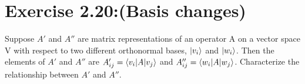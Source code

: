 \section{\Large Exercise 2.20:(Basis changes)}
Suppose $A'$ and $A''$ are matrix representations of an operator A on a vector space V
with respect to two different orthonormal bases, $\ket{v_i}$ and $\ket{w_i}$.
Then the elements of $A'$ and $A''$ are $A_{ij}' = \braket{v_i|A|v_j}$ and
$A_{ij}'' = \braket{w_i|A|w_j}$.
Characterize the relationship between $A'$ and $A''$.
